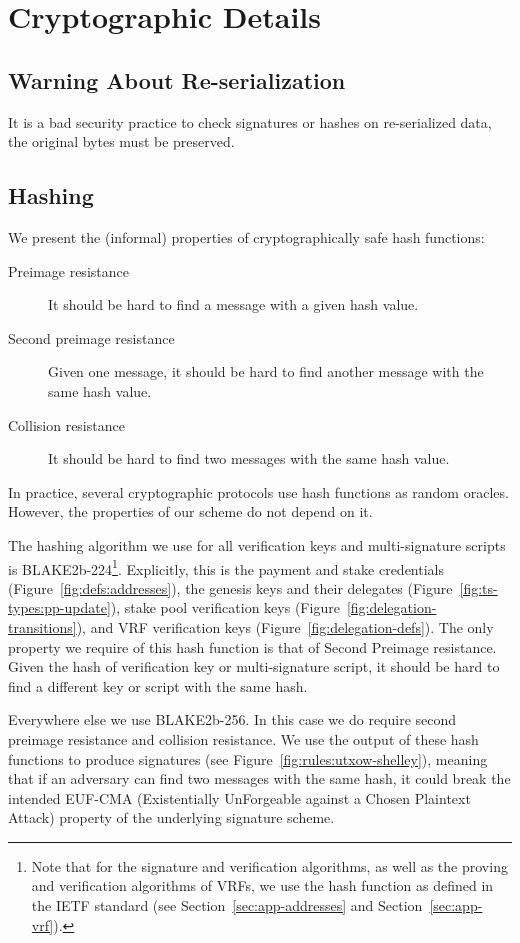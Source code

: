 \section{Cryptographic Details}
\label{sec:crypto-details}

\subsection{Warning About Re-serialization}
It is a bad security practice to check signatures or hashes on re-serialized data,
the original bytes must be preserved.

\subsection{Hashing}
We present the (informal) properties of cryptographically safe hash functions:
\begin{description}
\item[Preimage resistance] It should be hard to find a message with a given hash value.
\item[Second preimage resistance] Given one message, it should be hard to find another message with the same hash value.
\item[Collision resistance] It should be hard to find two messages with the same hash value. 
\end{description}

\noindent In practice, several cryptographic protocols use hash functions as random oracles. 
However, the properties of our scheme do not depend on it.  

The hashing algorithm we use for all verification keys and multi-signature scripts is BLAKE2b-224\footnote{Note that for the signature 
and verification algorithms, as well as the proving and verification algorithms of VRFs, we use the hash function as defined in the IETF standard (see Section~\ref{sec:app-addresses} and Section~\ref{sec:app-vrf}).}.
Explicitly, this is the payment and stake credentials (Figure~\ref{fig:defs:addresses}),
the genesis keys and their delegates (Figure~\ref{fig:ts-types:pp-update}),
stake pool verification keys (Figure~\ref{fig:delegation-transitions}),
and VRF verification keys (Figure~\ref{fig:delegation-defs}). 
The only property we require of this hash function is that of Second Preimage resistance. Given the hash of verification key or multi-signature script, it should be hard to find a different key or script with the same hash. 

Everywhere else we use BLAKE2b-256. In this case we do require second preimage resistance and collision resistance. We use the output of these hash functions to produce signatures (see Figure~\ref{fig:rules:utxow-shelley}), meaning that if an adversary can find two messages with the same hash, it could break the intended EUF-CMA (Existentially UnForgeable against a Chosen Plaintext Attack) property of the underlying signature scheme. 
 

